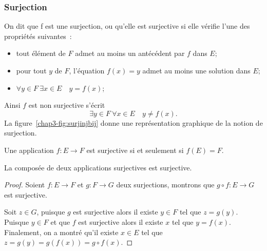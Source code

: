 \subsubsection{Surjection}
\label{chap3-subsubsec:surjection}
\begin{defdef}
  On dit que f est une surjection, ou qu'elle est surjective si elle vérifie l'une des propriétés suivantes~:
  \begin{itemize}
  \item tout élément de $F$ admet au moins un antécédent par $f$ dans $E$;
  \item pour tout $y$ de $F$, l'équation $f(x)=y$ admet au moins une solution dans $E$;
  \item $\forall y \in F \ \exists x \in E \quad y=f(x)$;
  \end{itemize}
  Ainsi $f$ est non surjective s'écrit
  \begin{equation}
    \exists y \in F \ \forall x \in E \quad y \neq f(x).
  \end{equation}
  La figure~\ref{chap3-fig:surjinjbij} donne une représentation graphique de la notion de surjection.
\end{defdef}
\begin{prop}
  Une application $f:E \longrightarrow F$ est surjective si et seulement si $f(E)=F$.
\end{prop}
\begin{theo}
  La composée de deux applications surjectives est surjective.
\end{theo}
\begin{proof}
  Soient $f:E \longrightarrow F$ et $g:F \longrightarrow G$ deux surjections, montrons que $g \circ f: E \longrightarrow G$ est surjective. 

  Soit $z \in G$, puisque $g$ est surjective alors il existe $y \in F$ tel que $z=g(y)$. Puisque $y \in F$ et que $f$ est surjective alors il existe $x$ tel que $y=f(x)$. Finalement, on a montré qu'il existe $x \in E$ tel que $z=g(y)=g(f(x))= g \circ f(x)$.
\end{proof}
%
